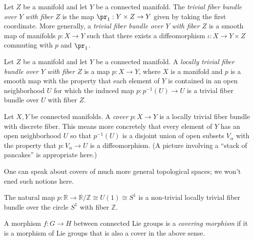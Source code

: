 \documentclass[reqno]{amsart} 
\begin{document}
\begin{definition}
  Let $Z$ be a manifold and let $Y$ be a connected manifold.  The \emph{trivial fiber bundle over $Y$ with fiber $Z$} is the map $\pr_1 : Y \times Z \rightarrow Y$ given by taking the first coordinate.  More generally, a \emph{trivial fiber bundle over $Y$ with fiber $Z$} is a smooth map of manifolds $p : X \rightarrow Y$ such that there exists a diffeomorphism $\iota : X \rightarrow Y \times Z$ commuting with $p$ and $\pr_1$.
\end{definition}

\begin{definition}
  Let $Z$ be a manifold and let $Y$ be a connected manifold.  A \emph{locally trivial fiber bundle over $Y$ with fiber $Z$} is a map $p : X \rightarrow Y$, where $X$ is a manifold and $p$ is a smooth map with the property that each element of $Y$ is contained in an open neighborhood $U$ for which the induced map $p : p^{-1}(U) \rightarrow U$ is a trivial fiber bundle over $U$ with fiber $Z$.
\end{definition}

\begin{definition}\label{defn:cover}
  Let $X,Y$ be connected manifolds.  A \emph{cover} $p : X \rightarrow Y$ is a locally trivial fiber bundle with discrete fiber.  This means more concretely that every element of $Y$ has an open neighborhood $U$ so that $p^{-1}(U)$ is a disjoint union of open subsets $V_\alpha$ with the property that $p : V_\alpha \rightarrow U$ is a diffeomorphism.  (A picture involving a ``stack of pancakes'' is appropriate here.)
\end{definition}
\begin{remark}
 One can speak about covers of much more general topological spaces; we won't ened such notions here. 
\end{remark}

\begin{example}
  The natural map $p : \mathbb{R} \rightarrow \mathbb{R}/\mathbb{Z} \cong U(1) \cong S^1$ is a non-trivial locally trivial fiber bundle over the circle $S^1$ with fiber $\mathbb{Z}$.
\end{example}

\begin{definition}
  A morphism $f : G \rightarrow H$ between connected Lie groups is a \emph{covering morphism} if it is a morphism of Lie groups that is also a cover in the above sense.
\end{definition}
\end{document}
